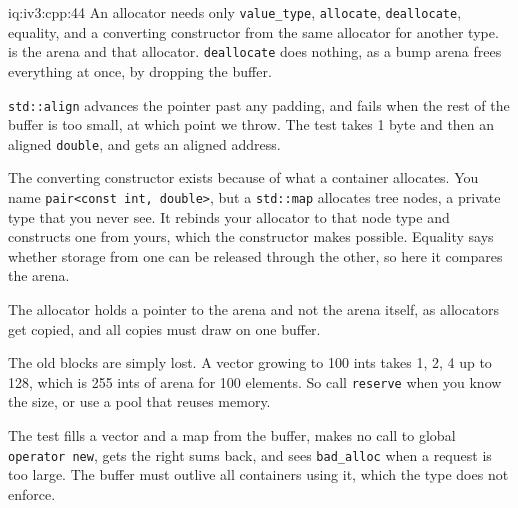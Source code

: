\begin{solution}{iq:iv3:cpp:44}
An allocator needs only \texttt{value\_type}, \texttt{allocate}, \texttt{deallocate}, equality, and a converting constructor from the same allocator for another type.  is the arena and that allocator. \texttt{deallocate} does nothing, as a bump arena frees everything at once, by dropping the buffer.
\label{lst:iv3:cp:arena}

\texttt{std::align} advances the pointer past any padding, and fails when the rest of the buffer is too small, at which point we throw. The test takes 1 byte and then an aligned \texttt{double}, and gets an aligned address.

The converting constructor exists because of what a container allocates. You name \texttt{pair<const int, double>}, but a \texttt{std::map} allocates tree nodes, a private type that you never see. It rebinds your allocator to that node type and constructs one from yours, which the constructor makes possible. Equality says whether storage from one can be released through the other, so here it compares the arena.

The allocator holds a pointer to the arena and not the arena itself, as allocators get copied, and all copies must draw on one buffer.

The old blocks are simply lost. A vector growing to 100 ints takes 1, 2, 4 up to 128, which is 255 ints of arena for 100 elements. So call \texttt{reserve} when you know the size, or use a pool that reuses memory.

The test fills a vector and a map from the buffer, makes no call to global \texttt{operator new}, gets the right sums back, and sees \texttt{bad\_alloc} when a request is too large. The buffer must outlive all containers using it, which the type does not enforce.

\end{solution}

